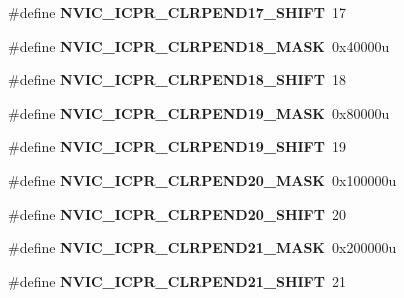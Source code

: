 \begin{DoxyCompactItemize}
\#define {\bfseries N\+V\+I\+C\+\_\+\+I\+C\+P\+R\+\_\+\+C\+L\+R\+P\+E\+N\+D17\+\_\+\+S\+H\+I\+FT}~17
\item 
\mbox{\label{group___n_v_i_c___register___masks_gaeb056b06ea673a36c0668609aa2b5429}} 
\#define {\bfseries N\+V\+I\+C\+\_\+\+I\+C\+P\+R\+\_\+\+C\+L\+R\+P\+E\+N\+D18\+\_\+\+M\+A\+SK}~0x40000u
\item 
\mbox{\label{group___n_v_i_c___register___masks_ga0d69ef0706d76fcda2c723255060c413}} 
\#define {\bfseries N\+V\+I\+C\+\_\+\+I\+C\+P\+R\+\_\+\+C\+L\+R\+P\+E\+N\+D18\+\_\+\+S\+H\+I\+FT}~18
\item 
\mbox{\label{group___n_v_i_c___register___masks_gada49f8082e4c597bab2cd511e37be5a3}} 
\#define {\bfseries N\+V\+I\+C\+\_\+\+I\+C\+P\+R\+\_\+\+C\+L\+R\+P\+E\+N\+D19\+\_\+\+M\+A\+SK}~0x80000u
\item 
\mbox{\label{group___n_v_i_c___register___masks_gaa0e63343e2eff0c67356fce25bfbffcd}} 
\#define {\bfseries N\+V\+I\+C\+\_\+\+I\+C\+P\+R\+\_\+\+C\+L\+R\+P\+E\+N\+D19\+\_\+\+S\+H\+I\+FT}~19
\item 
\mbox{\label{group___n_v_i_c___register___masks_ga3134a3b048a677d2bae8a617d29f1d4c}} 
\#define {\bfseries N\+V\+I\+C\+\_\+\+I\+C\+P\+R\+\_\+\+C\+L\+R\+P\+E\+N\+D20\+\_\+\+M\+A\+SK}~0x100000u
\item 
\mbox{\label{group___n_v_i_c___register___masks_gacdaa2cee9af15389bce4b98f565ecff9}} 
\#define {\bfseries N\+V\+I\+C\+\_\+\+I\+C\+P\+R\+\_\+\+C\+L\+R\+P\+E\+N\+D20\+\_\+\+S\+H\+I\+FT}~20
\item 
\mbox{\label{group___n_v_i_c___register___masks_ga139c52aed9f13266dcbcd4a35062ad9d}} 
\#define {\bfseries N\+V\+I\+C\+\_\+\+I\+C\+P\+R\+\_\+\+C\+L\+R\+P\+E\+N\+D21\+\_\+\+M\+A\+SK}~0x200000u
\item 
\mbox{\label{group___n_v_i_c___register___masks_ga197f79ac8c0c2d547290f6ea241935ce}} 
\#define {\bfseries N\+V\+I\+C\+\_\+\+I\+C\+P\+R\+\_\+\+C\+L\+R\+P\+E\+N\+D21\+\_\+\+S\+H\+I\+FT}~21

\end{DoxyCompactItemize}
